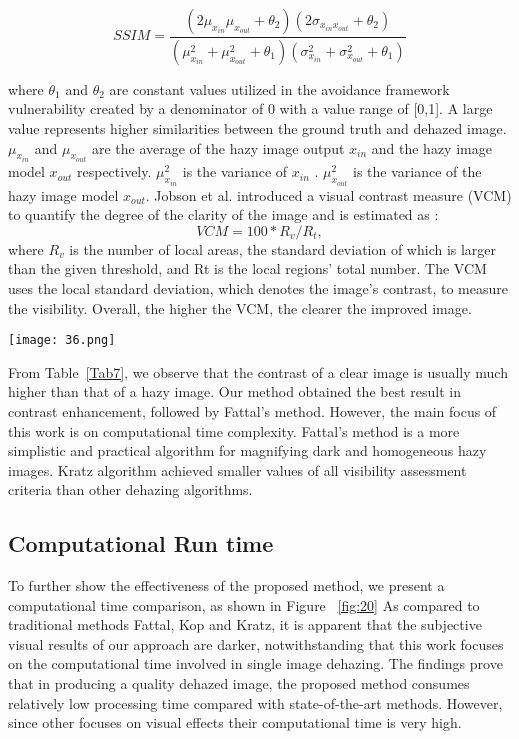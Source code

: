 \documentclass[doctor,english,listoffigures,listoftables]{thesis-uestc}
\begin{document}
\begin{equation}
	SSIM= \frac{(2\mu_{ x_{in}}\mu _{x_{out}}+ \theta _2) (2 \sigma _{x_{in} x_{out}}+ \theta _2)}  { ( \mu ^2_{ x_{in}}+ \mu^2_{x_{out}}+ \theta_1)( \sigma^2_{x_{in}} +\sigma^2_{x_{out}} +\theta_1)      }
\end{equation}

where $\theta_1$ and $\theta_2$ are constant values utilized in the avoidance framework vulnerability created by a denominator of 0 with a  value range of [0,1]. A large value represents higher similarities between the ground truth and dehazed image. $\mu_{ x_{in}}$ and $ \mu_{ x_{out}}$ are the average of the hazy image output $ x_{in} $ and the hazy image model $x_{out}$ respectively. $\mu^2_{x_{in}}$ is the variance  of $ x_{in} $ . $ \mu^2_{x_{out}}$ is the variance of the hazy image model $x_{out}$.
Jobson et al. introduced a visual contrast measure (VCM) to quantify the degree of the clarity of the image and is estimated as : 
\begin{equation}
VCM=100*R_v/R_t,
\end{equation}
where $R_v$ is the number of local areas, the standard deviation of which is larger than the given threshold, and Rt is the local regions' total number. The VCM uses the local standard deviation, which denotes the image's contrast, to measure the visibility. Overall, the higher the VCM, the clearer the improved image.
\begin{figure*}
	\centering
	\texttt{[image: 36.png]}
	\caption{Comparisons of traditional dehazing algorithms based on computational time complexity. Average time is measured in seconds}
	\label{fig:20}
\end{figure*}

From Table~\ref{Tab7}, we observe that the contrast of a clear image is usually much higher than that of a hazy image. Our method obtained the best result in contrast enhancement, followed by Fattal's method.  However, the main focus of this work is on computational time complexity. Fattal's method is a more simplistic and practical algorithm for magnifying dark and homogeneous hazy images. Kratz algorithm achieved smaller values of all visibility assessment criteria than other dehazing algorithms. 

\subsection{Computational Run time}
To further show the effectiveness of the proposed method, we present a computational time comparison, as shown in Figure ~\ref{fig:20}
As compared to traditional methods Fattal, Kop and Kratz, it is apparent that the subjective visual results of our approach are darker, notwithstanding that this work focuses on the computational time involved in single image dehazing. The findings prove that in producing a quality dehazed image, the proposed method consumes relatively low processing time compared with state-of-the-art methods. However, since other focuses on visual effects their computational time is very high. 
\end{document}

